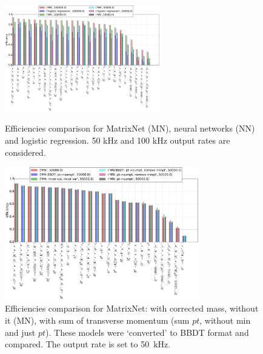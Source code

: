 \documentclass[a4paper]{jpconf}
\begin{document}
\begin{figure}[h]
\begin{minipage}{16pc}
\includegraphics[width=16pc]{../images/track}
\caption{\label{hlt1_res} Efficiencies comparison for MatrixNet (MN), neural networks (NN) and logistic regression. 50 kHz and 100 kHz output rates are considered. \\}
\end{minipage}\hspace{2pc}%
\begin{minipage}{20pc}
\includegraphics[width=20pc]{../images/hlt1-2body}
\caption{\label{hlt12_res} Efficiencies comparison for MatrixNet: with corrected mass, without it (MN), with sum of transverse momentum (sum $pt$, without min and just $pt$). These models were `converted' to BBDT format and compared. The output rate is set to 50~kHz.}
\end{minipage} 
\end{figure}
\end{document}
